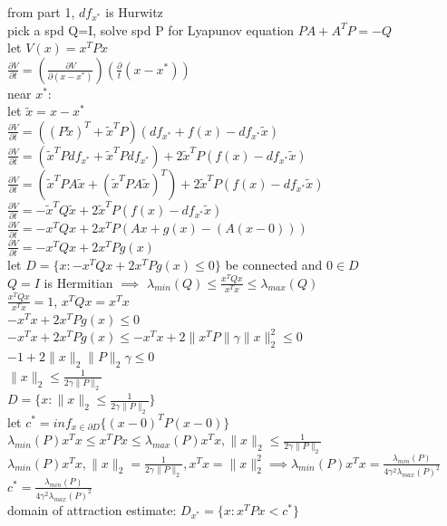 \documentclass[12pt,letter]{article}
\begin{document}
\begin{itemize}
\begin{enumerate}
      from part 1, $df_{x^*}$ is Hurwitz\\
      pick a spd Q=I, solve spd P for Lyapunov equation $PA+A^TP=-Q$\\
      let $V(x)=x^TPx$\\
      $\frac{\partial V}{\partial t} = (\frac{\partial V}{\partial (x-x^*)})(\frac{\partial}{t} (x-x^*))$\\
      near $x^*$:\\
      let $\tilde{x}=x-x^*$\\
      $\frac{\partial V}{\partial t} = ((P\tilde{x})^T+\tilde{x}^TP)(df_{x^*}+f(x)-df_{x^*}\tilde{x})$\\
      $\frac{\partial V}{\partial t} = (\tilde{x}^TPdf_{x^*}+\tilde{x}^TPdf_{x^*})+2\tilde{x}^TP(f(x)-df_{x^*}\tilde{x})$\\
      $\frac{\partial V}{\partial t} = (\tilde{x}^TPA\tilde{x}+(\tilde{x}^TPA\tilde{x})^T)+2\tilde{x}^TP(f(x)-df_{x^*}\tilde{x})$\\
      $\frac{\partial V}{\partial t} = -\tilde{x}^TQ\tilde{x}+2\tilde{x}^TP(f(x)-df_{x^*}\tilde{x})$\\
      $\frac{\partial V}{\partial t} = -x^TQx+2x^TP(Ax+g(x)-(A(x-0)))$\\
      $\frac{\partial V}{\partial t} = -x^TQx+2x^TPg(x)$\\
      let $D=\{x: - x^TQx+2x^TPg(x) \leq 0 \}$ be connected and $0 \in D$\\
      $Q=I$ is Hermitian $\implies$ $\lambda_{min}(Q) \leq \frac{x^TQx}{x^Tx} \leq \lambda_{max}(Q)$\\
      $\frac{x^TQx}{x^Tx}=1$, $x^TQx=x^Tx$\\
      $- x^Tx + 2x^TPg(x) \leq 0 $\\
      $- x^Tx + 2x^TPg(x) \leq - x^Tx + 2\|x^TP\|\gamma\|x\|_2^2 \leq 0 $\\
      $-1 + 2\|x\|_2\|P\|_2\gamma \leq 0 $\\
      $\|x\|_2 \leq \frac{1}{2 \gamma \|P\|_2}$\\
      $D=\{x: \|x\|_2 \leq \frac{1}{2 \gamma \|P\|_2} \}$\\
      let $c^*=inf_{x \in \partial D}\{ (x-0)^TP(x-0) \}$\\
      $\lambda_{min}(P)  x^Tx \leq x^TPx \leq \lambda_{max}(P) x^Tx, \|x\|_2 \leq \frac{1}{2 \gamma \|P\|_2}$\\
      $\lambda_{min}(P)  x^Tx, \|x\|_2 = \frac{1}{2 \gamma \|P\|_2}, x^Tx = \|x\|_2^2 \implies \lambda_{min}(P)  x^Tx = \frac{\lambda_{min}(P)}{4\gamma^2 \lambda_{max}(P)^2}$\\
      $c^*=\frac{\lambda_{min}(P)}{4\gamma^2 \lambda_{max}(P)^2}$\\
      domain of attraction estimate: $D_{x^*}=\{x: x^TPx< c^*\}$\\
      

\end{enumerate}
\end{itemize}
\end{document}
